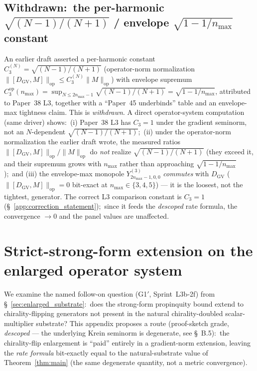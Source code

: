\documentclass[11pt,a4paper]{article}
\theoremstyle{plain}
\theoremstyle{definition}
\newcommand{\nmax}{n_{\max}}
\newcommand{\opnorm}[1]{\lVert #1 \rVert_{\mathrm{op}}}
\newcommand{\DGV}{D_{\mathrm{GV}}}
\newcommand{\Cthreeop}{C_{3}^{\mathrm{op}}}
\begin{document}
\subsection{Withdrawn:\ the per-harmonic $\sqrt{(N-1)/(N+1)}$ /
envelope $\sqrt{1 - 1/\nmax}$ constant}\label{app:correction_text}

An earlier draft asserted a per-harmonic constant
$C_{3}^{(N)} = \sqrt{(N-1)/(N+1)}$ (operator-norm normalization
$\opnorm{[\DGV, M]} \le C_{3}^{(N)} \opnorm{M}$) with envelope supremum
$\Cthreeop(\nmax) = \sup_{N \le 2\nmax - 1} \sqrt{(N-1)/(N+1)}
= \sqrt{1 - 1/\nmax}$, attributed to Paper~38 L3, together with a
``Paper~45 underbinds'' table and an envelope-max tightness claim. This is
\emph{withdrawn}. A direct operator-system computation (same driver) shows:\
(i) Paper~38 L3 has $C_{3} = 1$ under the gradient seminorm, not an
$N$-dependent $\sqrt{(N-1)/(N+1)}$;\ (ii) under the operator-norm
normalization the earlier draft wrote, the measured ratios
$\opnorm{[\DGV, M]}/\opnorm{M}$ do \emph{not} realize $\sqrt{(N-1)/(N+1)}$
(they exceed it, and their supremum grows with $\nmax$ rather than
approaching $\sqrt{1 - 1/\nmax}$);\ and (iii) the envelope-max monopole
$Y^{(3)}_{2\nmax - 1, 0, 0}$ \emph{commutes} with $\DGV$
($\opnorm{[\DGV, M]} = 0$ bit-exact at $\nmax \in \{3, 4, 5\}$) --- it is the
loosest, not the tightest, generator. The correct L3 comparison constant is
$C_{3} = 1$ (\S~\ref{app:correction_statement});\ since it feeds the
\emph{descoped} rate formula, the convergence $\to 0$ and the panel values
are unaffected.

\section{Strict-strong-form extension on the enlarged operator system}
\label{app:enlarged}

We examine the named follow-on question
(G1$'$, Sprint~L3b-2f) from \S~\ref{sec:enlarged_substrate}:\ does
the strong-form propinquity bound extend to chirality-flipping
generators not present in the natural chirality-doubled
scalar-multiplier substrate? This appendix proposes a route (proof-sketch
grade, \emph{descoped} --- the underlying Krein seminorm is degenerate, see
\S~B.5):\ the chirality-flip enlargement is
``paid'' entirely in a gradient-norm extension, leaving the
\emph{rate formula} bit-exactly equal to the natural-substrate value
of Theorem~\ref{thm:main} (the same degenerate quantity, not a metric convergence).
\end{document}
